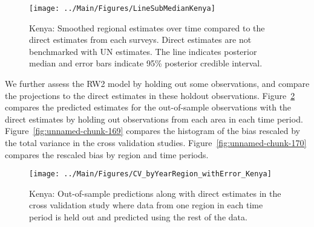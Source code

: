 \documentclass[12pt]{article}\usepackage[]{graphicx}\usepackage[]{color}
\newenvironment{knitrout}{}{} %
\begin{document}
\begin{knitrout}
\color{fgcolor}\begin{figure}[bht]

{\centering \texttt{[image: ../Main/Figures/LineSubMedianKenya]} 

}

\caption[Kenya]{Kenya: Smoothed regional estimates over time compared to the direct estimates from each surveys. Direct estimates are not benchmarked with UN estimates. The line indicates posterior median and error bars indicate 95\% posterior credible interval.}\label{fig:unnamed-chunk-167}
\end{figure}


\end{knitrout}
We further assess the RW2 model by holding out some observations, and compare the projections to the direct estimates in these holdout observations. Figure~\ref{fig:unnamed-chunk-168} compares the predicted estimates for the out-of-sample observations  with the direct estimates by holding out observations from each area in each time period.  Figure~\ref{fig:unnamed-chunk-169} compares the histogram of the bias rescaled by the total variance in the cross validation studies. Figure~\ref{fig:unnamed-chunk-170} compares the rescaled bias by region and time periods.



 
\begin{knitrout}
\color{fgcolor}\begin{figure}[bht]

{\centering \texttt{[image: ../Main/Figures/CV\_byYearRegion\_withError\_Kenya]} 

}

\caption[Kenya]{Kenya: Out-of-sample predictions along with direct estimates in the cross validation study where data from one region in each time period is held out and predicted using the rest of the data.}\label{fig:unnamed-chunk-168}
\end{figure}


\end{knitrout}
\end{document}
